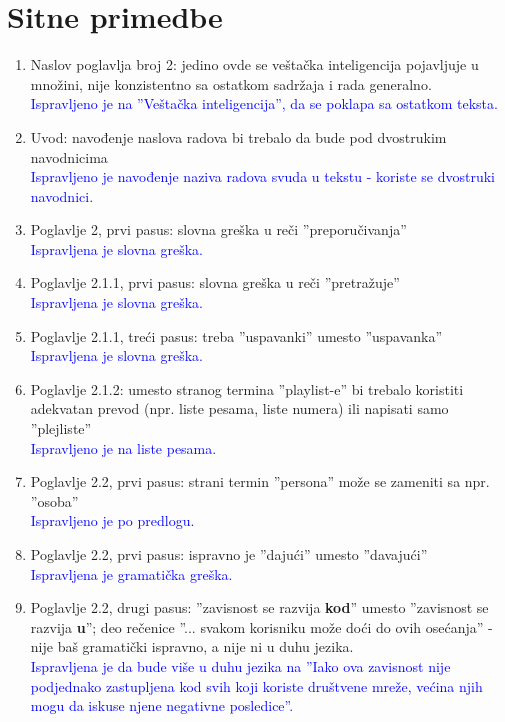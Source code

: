 \documentclass[a4paper]{report}
\newcommand{\odgovor}[1]{\textcolor{blue}{#1}}
\begin{document}
\section{Sitne primedbe}
\begin{enumerate}
\item Naslov poglavlja broj 2: jedino ovde se veštačka inteligencija pojavljuje u množini, nije konzistentno sa ostatkom sadržaja i rada generalno. \\
\odgovor{Ispravljeno je na ''Veštačka inteligencija'', da se poklapa sa ostatkom teksta.}

\item Uvod: navođenje naslova radova bi trebalo da bude pod dvostrukim navodnicima \\
\odgovor{Ispravljeno je navođenje naziva radova svuda u tekstu - koriste se dvostruki navodnici.}

\item Poglavlje 2, prvi pasus: slovna greška u reči ''preporučivanja'' \\
\odgovor{Ispravljena je slovna greška.}

\item Poglavlje 2.1.1, prvi pasus: slovna greška u reči ''pretražuje'' \\
\odgovor{Ispravljena je slovna greška.}

\item Poglavlje 2.1.1, treći pasus: treba ''uspavanki'' umesto ''uspavanka'' \\
\odgovor{Ispravljena je slovna greška.}

\item Poglavlje 2.1.2: umesto stranog termina ''playlist-e'' bi trebalo koristiti adekvatan prevod (npr. liste pesama, liste numera) ili napisati samo ''plejliste'' \\
\odgovor{Ispravljeno je na liste pesama.}


\item Poglavlje 2.2, prvi pasus: strani termin ''persona'' može se zameniti sa npr. ''osoba'' \\
\odgovor{Ispravljeno je po predlogu.}

\item Poglavlje 2.2, prvi pasus: ispravno je ''dajući'' umesto ''davajući'' \\
\odgovor{Ispravljena je gramatička greška.}

\item Poglavlje 2.2, drugi pasus: ''zavisnost se razvija \textbf{kod}'' umesto ''zavisnost se razvija \textbf{u}''; deo rečenice ''... svakom korisniku može doći do ovih osećanja'' - nije baš gramatički ispravno, a nije ni u duhu jezika. \\
\odgovor{Ispravljena je da bude više u duhu jezika na ''Iako ova zavisnost nije podjednako zastupljena kod svih koji koriste društvene mreže, većina njih mogu da iskuse njene negativne posledice''.}


\end{enumerate}
\end{document}
